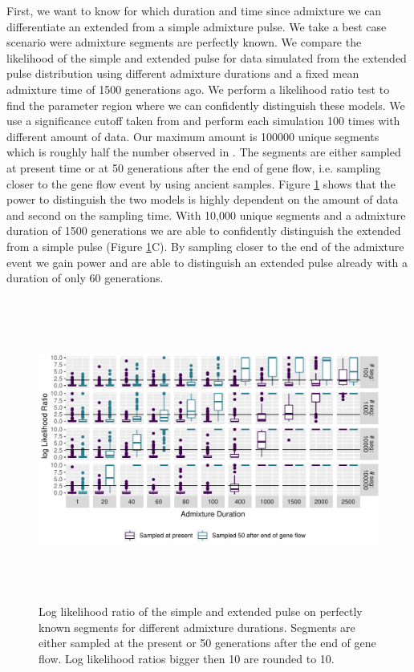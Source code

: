 \documentclass[11pt]{article}
\begin{document}
First, we want to know for which duration and time since admixture we can differentiate an extended from a simple admixture pulse. We take a best case scenario were admixture segments are perfectly known. We compare the likelihood of the simple and extended pulse for data simulated from the extended pulse distribution using different admixture durations and a fixed mean admixture time of 1500 generations ago. We perform a likelihood ratio test to find the parameter region where we can confidently distinguish these models. We use a significance cutoff taken from \cite{Kozubowski_Testing_2008} and perform each simulation 100 times with different amount of data. Our maximum amount is 100000 unique segments which is roughly half the number observed in \cite{skov_nature_2020}. The segments are either sampled at present time or at 50 generations after the end of gene flow, i.e. sampling closer to the gene flow event by using ancient samples. Figure \ref{fig:fig1_1} shows that the power to distinguish the two models is highly dependent on the amount of data and second on the sampling time. With 10,000 unique segments and a admixture duration of 1500 generations we are able to confidently distinguish the extended from a simple pulse (Figure \ref{fig:fig1_1}C). By sampling closer to the end of the admixture event we gain power and are able to distinguish an extended pulse already with a duration of only 60 generations.

\begin{figure}
\centering
\includegraphics[width=18cm,height=10cm,keepaspectratio]{ATE_Revisions_files/figure-latex/figR1-1.pdf}
\caption{\label{fig:fig1_1} Log likelihood ratio of the simple and extended pulse on perfectly known segments for different admixture durations. Segments are either sampled at the present or 50 generations after the end of gene flow. Log likelihood ratios bigger then 10 are rounded to 10.}
\end{figure}
\end{document}
